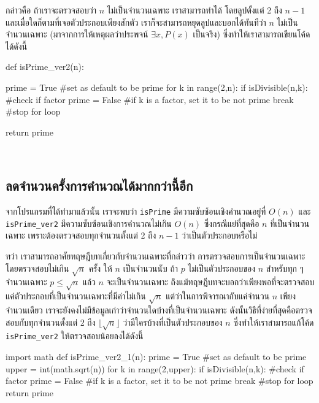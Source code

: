 กล่าวคือ ถ้าเราจะตรวจสอบว่า $n$ ไม่เป็นจำนวนเฉพาะ เราสามารถทำได้ โดยลูปตั้งแต่ 2 ถึง $n-1$ และเมื่อใดก็ตามที่เจอตัวประกอบเพียงสักตัว เราก็จะสามารถหยุดลูปและบอกได้ทันทีว่า $n$ ไม่เป็นจำนวนเฉพาะ (มาจากการให้เหตุผลว่าประพจน์ $\exists x, P(x)$ เป็นจริง) ซึ่งทำให้เราสามารถเขียนโค้ดได้ดังนี้

\begin{python}
def isPrime_ver2(n):

    prime = True               #set as default to be prime
    for k in range(2,n):
        if isDivisible(n,k):   #check if factor
            prime = False      #if k is a factor, set it to be not prime
            break              #stop for loop
    
    return prime
\end{python}

~
\subsection{ลดจำนวนครั้งการคำนวณได้มากกว่านี้อีก}
จากโปรแกรมที่ได้ทำมาแล้วนั้น เราจะพบว่า \texttt{isPrime} มีความซับซ้อนเชิงคำนวณอยู่ที่ $O(n)$ และ \texttt{isPrime\_ver2} มีความซับซ้อนเชิงการคำนวณไม่เกิน $O(n)$ ซึ่งกรณีแย่ที่สุดคือ $n$ ที่เป็นจำนวนเฉพาะ เพราะต้องตรวจสอบทุกจำนวนตั้งแต่ 2 ถึง $n-1$ ว่าเป็นตัวประกอบหรือไม่

ทว่า เราสามารถอาศัยทฤษฎีบทเกี่ยวกับจำนวนเฉพาะที่กล่าวว่า
\boxrule
{การตรวจสอบการเป็นจำนวนเฉพาะโดยตรวจสอบไม่เกิน $\sqrt{n}$ ครั้ง}
{ให้ $n$ เป็นจำนวนนับ ถ้า $p$ ไม่เป็นตัวประกอบของ $n$ สำหรับทุก ๆ จำนวนเฉพาะ $p\leq \sqrt{n}$ แล้ว $n$ จะเป็นจำนวนเฉพาะ}
ถึงแม้ทฤษฎีบทจะบอกว่าเพียงพอที่จะตรวจสอบแค่ตัวประกอบที่เป็นจำนวนเฉพาะที่มีค่าไม่เกิน $\sqrt{n}$ แต่ว่าในการพิจารณากับแค่จำนวน $n$ เพียงจำนวนเดียว เราจะยังคงไม่มีข้อมูลเก่าว่าจำนวนใดบ้างที่เป็นจำนวนเฉพาะ ดังนั้นวิธีที่ง่ายที่สุดคือตรวจสอบกับทุกจำนวนตั้งแต่ 2 ถึง $\lfloor\sqrt{n}\rfloor$ ว่ามีใครบ้างที่เป็นตัวประกอบของ $n$ ซึ่งทำให้เราสามารถแก้โค้ด \texttt{isPrime\_ver2} ให้ตรวจสอบน้อยลงได้ดังนี้

\begin{python}
import math
def isPrime_ver2_1(n):
    prime = True               #set as default to be prime
    upper = int(math.sqrt(n))
    for k in range(2,upper):
        if isDivisible(n,k):   #check if factor
            prime = False      #if k is a factor, set it to be not prime
            break              #stop for loop
    return prime
\end{python}

